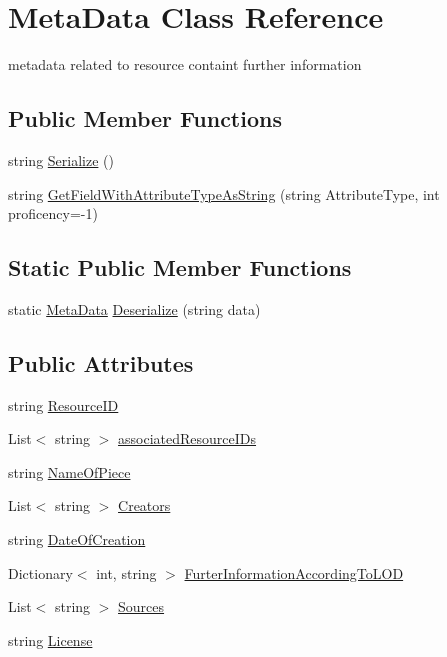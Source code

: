 \hypertarget{class_meta_data}{}\section{Meta\+Data Class Reference}
\label{class_meta_data}


metadata related to resource containt further information  


\subsection*{Public Member Functions}
\begin{DoxyCompactItemize}
\item 
string \mbox{\hyperlink{class_meta_data_ad61836ec0caf65061ecdcd16c0ee6109}{Serialize}} ()
\item 
string \mbox{\hyperlink{class_meta_data_a6060e6297723e54b0df6c20defb57297}{Get\+Field\+With\+Attribute\+Type\+As\+String}} (string Attribute\+Type, int proficency=-\/1)
\end{DoxyCompactItemize}
\subsection*{Static Public Member Functions}
\begin{DoxyCompactItemize}
\item 
static \mbox{\hyperlink{class_meta_data}{Meta\+Data}} \mbox{\hyperlink{class_meta_data_adcfb4cc074566933e35c3f14451960ed}{Deserialize}} (string data)
\end{DoxyCompactItemize}
\subsection*{Public Attributes}
\begin{DoxyCompactItemize}
\item 
string \mbox{\hyperlink{class_meta_data_a1bbd18efe27fdbeb0ee920414caa12c8}{Resource\+ID}}
\item 
List$<$ string $>$ \mbox{\hyperlink{class_meta_data_a1cdef15bd6753836cd2baa6533ebc306}{associated\+Resource\+I\+Ds}}
\item 
string \mbox{\hyperlink{class_meta_data_abb2ca2ab73300089a68d6c38f5610949}{Name\+Of\+Piece}}
\item 
List$<$ string $>$ \mbox{\hyperlink{class_meta_data_a498505a8b02fe2f7413092c42d81e8a7}{Creators}}
\item 
string \mbox{\hyperlink{class_meta_data_a693a56223c266f028740844681877e45}{Date\+Of\+Creation}}
\item 
Dictionary$<$ int, string $>$ \mbox{\hyperlink{class_meta_data_ab307dc4b5f061d3c8f610048176a6520}{Furter\+Information\+According\+To\+L\+OD}}
\item 
List$<$ string $>$ \mbox{\hyperlink{class_meta_data_acb76cf00c140a3da86a35ff350d0c05f}{Sources}}
\item 
string \mbox{\hyperlink{class_meta_data_a43c021341f7ac2b2237041aae37bd3db}{License}}
\end{DoxyCompactItemize}


